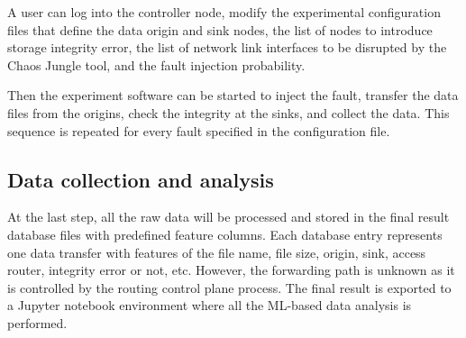 A user can log into the controller node, modify the experimental configuration files that define the data origin and sink nodes, the list of nodes to introduce storage integrity error, the list of network link interfaces to be disrupted by the Chaos Jungle tool, and the fault injection probability.

Then the experiment software can be started to inject the fault, transfer the data files from the origins, check the integrity at the sinks, and collect the data. This sequence is repeated for every fault specified in the configuration file.

\subsection{Data collection and analysis}
At the last step, all the raw data will be processed and stored in the final result database files with predefined feature columns. Each database entry represents one data transfer with features of the file name, file size, origin, sink, access router, integrity error or not, etc. However, the forwarding path is unknown as it is controlled by the routing control plane process. The final result is exported to a Jupyter notebook environment where all the ML-based data analysis is performed.





